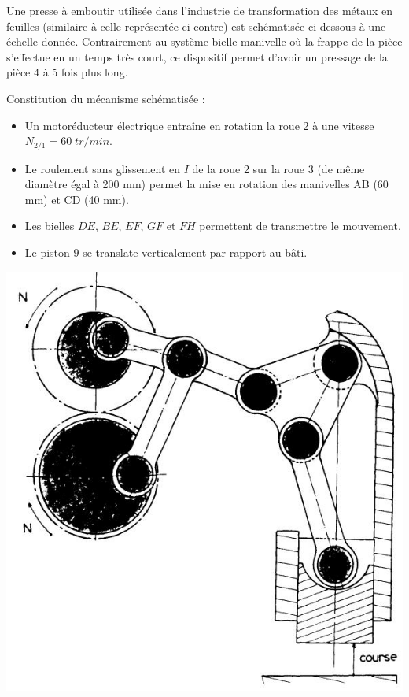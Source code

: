 \documentclass[11pt,oneside]{article}
\begin{document}
\begin{minipage}[c]{.45\linewidth}
Une presse à emboutir utilisée dans l’industrie de
transformation des métaux en feuilles (similaire à celle
représentée ci-contre) est schématisée ci-dessous à une
échelle donnée.
Contrairement au système bielle-manivelle où la frappe de la
pièce s’effectue en un temps très court, ce dispositif permet
d’avoir un pressage de la pièce 4 à 5 fois plus long.

Constitution du mécanisme schématisée :
\begin{itemize}
\item  Un motoréducteur électrique entraîne en rotation la roue 2 à une vitesse $N_{2/1}= 60 \;  tr/min$.
\item  Le roulement sans glissement en $I$ de la roue 2 sur la roue 3 (de même diamètre égal à
200 mm) permet la mise en rotation des manivelles AB (60 mm) et CD (40 mm).
\item  Les bielles $DE$, $BE$, $EF$, $GF$ et $FH$ permettent de transmettre le mouvement.
\item Le piston 9 se translate verticalement par rapport au bâti.
\end{itemize}
\end{minipage}\hfill
\begin{minipage}[c]{.45\linewidth}
\begin{center}
\includegraphics[width=.8\textwidth]{png/fig1}
\end{center}
\end{minipage}
\end{document}
